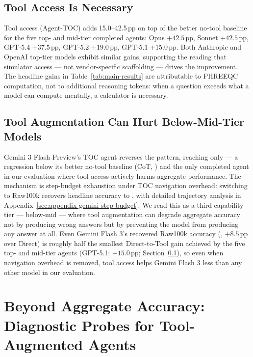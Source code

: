 \documentclass{article}
\begin{document}
\subsection{Tool Access Is Necessary}
\label{sec:main-tool}

Tool access (Agent-TOC) adds 15.0--42.5\,pp on top of the better no-tool baseline for the five top- and mid-tier completed agents: Opus $+42.5$\,pp, Sonnet $+42.5$\,pp, GPT-5.4 $+37.5$\,pp, GPT-5.2 $+19.0$\,pp, GPT-5.1 $+15.0$\,pp. Both Anthropic and OpenAI top-tier models exhibit similar gains, supporting the reading that simulator access --- not vendor-specific scaffolding --- drives the improvement. The headline gains in Table~\ref{tab:main-results} are attributable to PHREEQC computation, not to additional reasoning tokens: when a question exceeds what a model can compute mentally, a calculator is necessary.

\subsection{Tool Augmentation Can Hurt Below-Mid-Tier Models}
\label{sec:main-belowmid}

Gemini 3 Flash Preview's TOC agent reverses the pattern, reaching only \GeminiThreeFlashTOC{} --- a \GeminiThreeFlashTOCMinusBestNoTool{} regression below its better no-tool baseline (CoT, \GeminiThreeFlashCoT{}) and the only completed agent in our evaluation where tool access actively harms aggregate performance. The mechanism is step-budget exhaustion under TOC navigation overhead: switching to Raw100k recovers headline accuracy to \GeminiThreeFlashRaw{}, with detailed trajectory analysis in Appendix~\ref{sec:appendix-gemini-step-budget}. We read this as a third capability tier --- below-mid --- where tool augmentation can degrade aggregate accuracy not by producing wrong answers but by preventing the model from producing any answer at all. Even Gemini Flash 3's recovered Raw100k accuracy (\GeminiThreeFlashRaw{}, $+8.5$\,pp over Direct) is roughly half the smallest Direct-to-Tool gain achieved by the five top- and mid-tier agents (GPT-5.1: $+15.0$\,pp; Section~\ref{sec:main-tool}), so even when navigation overhead is removed, tool access helps Gemini Flash 3 less than any other model in our evaluation.

\section{Beyond Aggregate Accuracy: Diagnostic Probes for Tool-Augmented Agents}
\label{sec:diagnostic}
\end{document}
